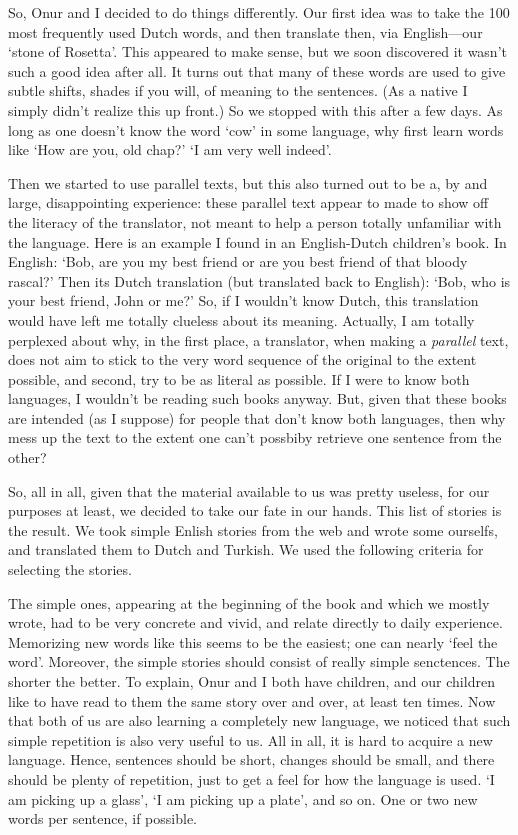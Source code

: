 So, Onur and I decided to do things differently. Our first idea was to take the 100 most frequently used Dutch words, and then translate then, via English---our `stone of Rosetta'. This appeared to make sense, but we soon discovered it wasn't such a good idea after all. It turns out that many of these words are used to give subtle shifts, shades if you will, of meaning to the sentences. (As a native I simply didn't realize  this up front.) So we stopped with this after a few days. As long as one doesn't know the word `cow' in some language, why first learn words like `How are you, old chap?' `I am very well indeed'. 

Then we started to use parallel texts, but this also turned out to be a, by and large, disappointing experience: these parallel text appear to made to show off the literacy of the translator,  not meant to help a person totally unfamiliar with the language. Here is an example I found in an English-Dutch children's book. In English: ‘Bob, are you my best friend or are you best friend of that bloody rascal?’ Then  its Dutch translation (but translated back to English): `Bob, who is your best friend, John or me?' So, if I wouldn't know Dutch, this translation would have left me totally clueless about its meaning. Actually, I am totally perplexed about why, in the first place, a translator, when making a \emph{parallel} text, does not aim to  stick to the very word sequence of the original to the extent possible, and second, try to be as literal as possible. If I were to know both languages, I wouldn't be reading such books anyway. But, given that these books are intended (as I suppose) for people that don't know both languages, then why mess up the text to the extent one can't possbiby retrieve one sentence from the other? 

So, all in all, given that the material available to us was pretty useless, for our purposes at least, we  decided to take our fate in our hands. This list of stories is the result. We took simple Enlish stories from the web and wrote some ourselfs, and translated them to Dutch and Turkish. We used the following criteria for selecting the stories. 

The simple ones, appearing at the beginning of the book and which we mostly wrote,  had to be very concrete and vivid, and relate directly to daily experience.  Memorizing new words like this seems to be the easiest; one can nearly `feel the word'. Moreover, the simple stories should consist of really simple senctences. The shorter the better. To explain, Onur and I both have children, and  our children like to have read to them the same story over and over, at least ten times. Now that both of us are also learning a completely new language, we noticed that such simple repetition is  also very useful to us. All in all, it is hard to acquire a new language. Hence, sentences should be short, changes should be small, and there should be plenty of repetition, just to get a feel for how the language is used. `I am picking up a glass', `I am picking up a plate', and so on. One or two new words per sentence, if possible. 

